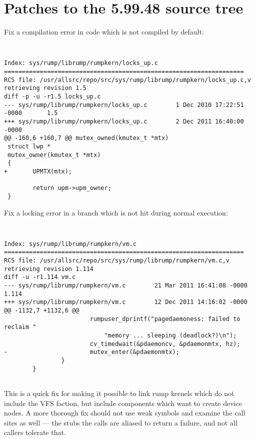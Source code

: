
\section{Patches to the 5.99.48 source tree}

Fix a compilation error in code which is not compiled by default:

{\tt \scriptsize
\begin{verbatim}
Index: sys/rump/librump/rumpkern/locks_up.c
===================================================================
RCS file: /usr/allsrc/repo/src/sys/rump/librump/rumpkern/locks_up.c,v
retrieving revision 1.5
diff -p -u -r1.5 locks_up.c
--- sys/rump/librump/rumpkern/locks_up.c        1 Dec 2010 17:22:51 -0000       1.5
+++ sys/rump/librump/rumpkern/locks_up.c        2 Dec 2011 16:40:00 -0000
@@ -160,6 +160,7 @@ mutex_owned(kmutex_t *mtx)
 struct lwp *
 mutex_owner(kmutex_t *mtx)
 {
+       UPMTX(mtx);
 
        return upm->upm_owner;
 }
\end{verbatim}}


Fix a locking error in a branch which is not hit during normal execution:

{\tt \scriptsize
\begin{verbatim}
Index: sys/rump/librump/rumpkern/vm.c
===================================================================
RCS file: /usr/allsrc/repo/src/sys/rump/librump/rumpkern/vm.c,v
retrieving revision 1.114
diff -u -r1.114 vm.c
--- sys/rump/librump/rumpkern/vm.c        21 Mar 2011 16:41:08 -0000      1.114
+++ sys/rump/librump/rumpkern/vm.c        12 Dec 2011 14:16:02 -0000
@@ -1132,7 +1132,6 @@
                        rumpuser_dprintf("pagedaemoness: failed to reclaim "
                            "memory ... sleeping (deadlock?)\n");
                        cv_timedwait(&pdaemoncv, &pdaemonmtx, hz);
-                       mutex_enter(&pdaemonmtx);
                }
        }
 
\end{verbatim}}
\clearpage

This is a quick fix for making it possible to link rump kernels
which do not include the VFS faction, but include components which
want to create device nodes.  A more thorough fix should not use
weak symbols and examine the call sites as well --- the stubs the
calls are aliased to return a failure, and not all callers tolerate
that.


